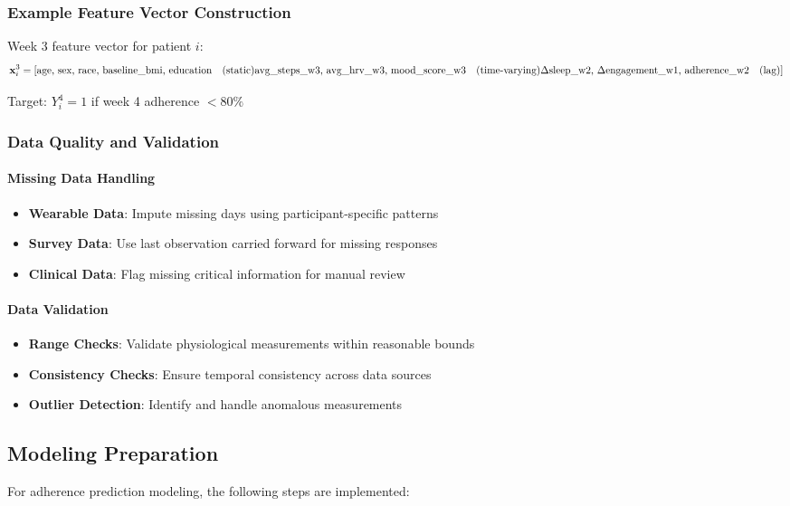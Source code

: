 \documentclass[12pt]{article}
\begin{document}
\subsubsection{Example Feature Vector Construction}

Week 3 feature vector for patient $i$:
\begin{equation}
\mathbf{x}_i^3 = [
\text{age, sex, race, baseline\_bmi, education} \quad \text{(static)} \\
\text{avg\_steps\_w3, avg\_hrv\_w3, mood\_score\_w3} \quad \text{(time-varying)} \\
\Delta\text{sleep\_w2, }\Delta\text{engagement\_w1, adherence\_w2} \quad \text{(lag)}
]
\end{equation}

Target: $Y_i^4 = 1$ if week 4 adherence $< 80\%$

\subsubsection{Data Quality and Validation}

\paragraph{Missing Data Handling}
\begin{itemize}
    \item \textbf{Wearable Data}: Impute missing days using participant-specific patterns
    \item \textbf{Survey Data}: Use last observation carried forward for missing responses
    \item \textbf{Clinical Data}: Flag missing critical information for manual review
\end{itemize}

\paragraph{Data Validation}
\begin{itemize}
    \item \textbf{Range Checks}: Validate physiological measurements within reasonable bounds
    \item \textbf{Consistency Checks}: Ensure temporal consistency across data sources
    \item \textbf{Outlier Detection}: Identify and handle anomalous measurements
\end{itemize}

\subsection{Modeling Preparation}
For adherence prediction modeling, the following steps are implemented:
\end{document}
